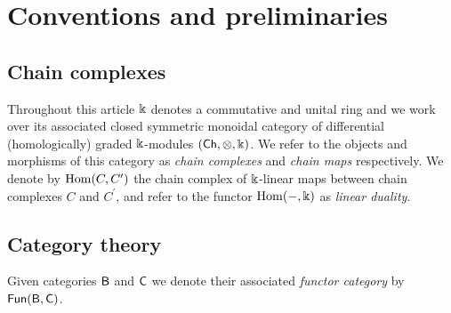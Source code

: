 
\section{Conventions and preliminaries} \label{s:preliminaries}

\subsection{Chain complexes }

Throughout this article $\Bbbk$ denotes a commutative and unital ring and we work over its associated closed symmetric monoidal category of differential (homologically) graded $\Bbbk$-modules $(\mathsf{Ch}, \otimes, \Bbbk)$.
We refer to the objects and morphisms of this category as \textit{chain complexes} and \textit{chain maps} respectively. We denote by $\mathrm{Hom}(C, C^\prime)$ the chain complex of $\Bbbk$-linear maps between chain complexes $C$ and $C^\prime$, and refer to the functor $\mathrm{Hom}(-, \Bbbk)$ as \textit{linear duality}.

\subsection{Category theory}

Given categories $\mathsf{B}$ and $\mathsf{C}$ we denote their associated \textit{functor category} by $\mathsf{Fun}(\mathsf{B}, \mathsf{C})$.

%

